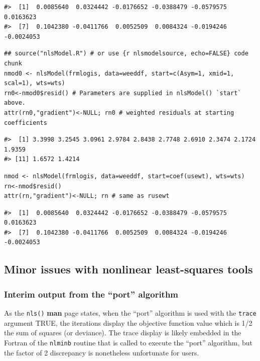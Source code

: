 \begin{verbatim}
#>  [1]  0.0085640  0.0324442 -0.0176652 -0.0388479 -0.0579575  0.0163623
#>  [7]  0.1042380 -0.0411766  0.0052509  0.0084324 -0.0194246 -0.0024053
\end{verbatim}

\begin{verbatim}
## source("nlsModel.R") # or use {r nlsmodelsource, echo=FALSE} code chunk
nmod0 <- nlsModel(frmlogis, data=weeddf, start=c(Asym=1, xmid=1, scal=1), wts=wts)
rn0<-nmod0$resid() # Parameters are supplied in nlsModel() `start` above.
attr(rn0,"gradient")<-NULL; rn0 # weighted residuals at starting coefficients
\end{verbatim}

\begin{verbatim}
#>  [1] 3.3998 3.2545 3.0961 2.9784 2.8438 2.7748 2.6910 2.3474 2.1724 1.9359
#> [11] 1.6572 1.4214
\end{verbatim}

\begin{verbatim}
nmod <- nlsModel(frmlogis, data=weeddf, start=coef(usewt), wts=wts)
rn<-nmod$resid()
attr(rn,"gradient")<-NULL; rn # same as rusewt
\end{verbatim}

\begin{verbatim}
#>  [1]  0.0085640  0.0324442 -0.0176652 -0.0388479 -0.0579575  0.0163623
#>  [7]  0.1042380 -0.0411766  0.0052509  0.0084324 -0.0194246 -0.0024053
\end{verbatim}

\subsection{Minor issues with nonlinear least-squares tools}\label{minor-issues-with-nonlinear-least-squares-tools}

\subsubsection{Interim output from the ``port'' algorithm}\label{interim-output-from-the-port-algorithm}

As the \texttt{nls()} \textbf{man} page states, when the ``port'' algorithm is used with the
\texttt{trace} argument TRUE, the iterations display the objective function value which
is 1/2 the sum of squares (or deviance). The trace display is likely
embedded in the Fortran of the \texttt{nlminb} routine that is called to execute
the ``port'' algorithm, but the factor of 2 discrepancy is nonetheless
unfortunate for users.

